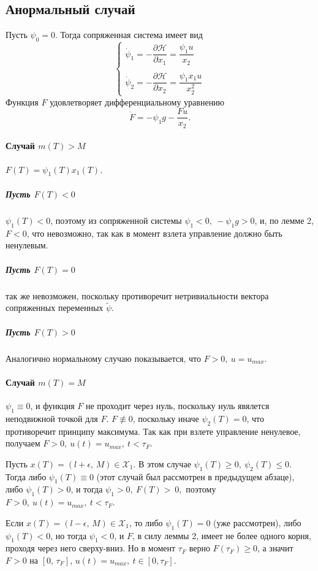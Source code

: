 \documentclass[16pt]{article}
\newcommand\X{\mathcal{X}}
\begin{document}
\subsection{Анормальный случай}
Пусть $\psi_0 = 0$. Тогда сопряженная система имеет вид
\begin{equation}
\begin{cases} \label{1conj_sys2}
\dot{\psi}_1 = -\dfrac{\partial \mathcal{H}}{\partial x_1} = \dfrac{\psi_1u}{x_2}\\
\\
\dot{\psi}_2 = -\dfrac{\partial \mathcal{H}}{\partial x_2} = \dfrac{\psi_1 x_1 u}{x_2^2}
\end{cases}
\end{equation}
Функция $F$ удовлетворяет дифференциальному уравнению
$$\dot{F} = -\psi_1g - \dfrac{Fu}{x_2}.$$

\paragraph{Случай $m(T) > M$} $F(T) = \psi_1(T)x_1(T)$. 
\subparagraph{Пусть $F(T) < 0$} $\psi_1(T) < 0$, поэтому из сопряженной системы $\psi_1 < 0, \ -\psi_1g > 0$,
и, по лемме 2, $F < 0$, что невозможно, так как в момент взлета управление должно быть ненулевым.
\subparagraph{Пусть $F(T) = 0$} так же невозможен, поскольку противоречит нетривиальности вектора 
сопряженных переменных $\tilde{\psi}$.
\subparagraph{Пусть $F(T) > 0$} Аналогично нормальному случаю показывается, что $F > 0, \ u = u_{max}$.

\paragraph{Случай $m(T) = M$} $\psi_1 \equiv 0$, и функция $F$ не проходит через нуль,
поскольку нуль явялется неподвижной точкой для $F$. $F \not\equiv 0$, поскольку иначе $\psi_2(T) = 0$, что 
противоречит принципу максимума. Так как при взлете управление ненулевое, получаем $F > 0, \ u(t) = u_{max},
\ t < \tau_F.$

Пусть $x(T) = (l+\epsilon,\, M) \in \X_1$. В этом случае $\psi_1(T) \geqslant 0, \ \psi_2(T) \leqslant 0$. 
Тогда либо $\psi_1(T) \equiv 0$ 
(этот случай был рассмотрен в предыдущем абзаце), либо $\psi_1(T) > 0$, и тогда $\psi_1 > 0, \ F(T) >~0,$ поэтому
$F > 0, \ u(t) = u_{max}, \ t < \tau_F$.

Если $x(T) = (l-\epsilon,\, M) \in \X_1$, то либо $\psi_1(T) = 0$ (уже рассмотрен), либо $\psi_1(T) < 0$, но тогда
$\psi_1 < 0$, и $F$, в силу леммы 2, имеет не более одного корня, проходя через него сверху-вниз. Но в момент
$\tau_F$ верно $F(\tau_F) \geqslant 0$, а значит $F > 0$ на $[0,\,\tau_F]$, $u(t) = u_{max}, \ t \in [0, \tau_F]$.
\end{document}
